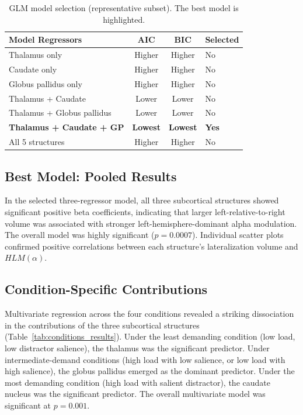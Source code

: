 \documentclass[12pt]{article}
\begin{document}
\begin{table}[ht]
\centering
\caption{GLM model selection (representative subset). The best model is highlighted.}
\label{tab:modelsel}
\begin{tabular}{lccl}
\toprule
Model Regressors & AIC & BIC & Selected \\
\midrule
Thalamus only & Higher & Higher & No \\
Caudate only & Higher & Higher & No \\
Globus pallidus only & Higher & Higher & No \\
Thalamus + Caudate & Lower & Lower & No \\
Thalamus + Globus pallidus & Lower & Lower & No \\
\textbf{Thalamus + Caudate + GP} & \textbf{Lowest} & \textbf{Lowest} & \textbf{Yes} \\
All 5 structures & Higher & Higher & No \\
\bottomrule
\end{tabular}
\end{table}

\subsection{Best Model: Pooled Results}

In the selected three-regressor model, all three subcortical structures showed significant positive beta coefficients, indicating that larger left-relative-to-right volume was associated with stronger left-hemisphere-dominant alpha modulation. The overall model was highly significant ($p = 0.0007$). Individual scatter plots confirmed positive correlations between each structure's lateralization volume and $HLM(\alpha)$.

\subsection{Condition-Specific Contributions}

Multivariate regression across the four conditions revealed a striking dissociation in the contributions of the three subcortical structures (Table~\ref{tab:conditions_results}). Under the least demanding condition (low load, low distractor salience), the thalamus was the significant predictor. Under intermediate-demand conditions (high load with low salience, or low load with high salience), the globus pallidus emerged as the dominant predictor. Under the most demanding condition (high load with salient distractor), the caudate nucleus was the significant predictor. The overall multivariate model was significant at $p = 0.001$.
\end{document}
